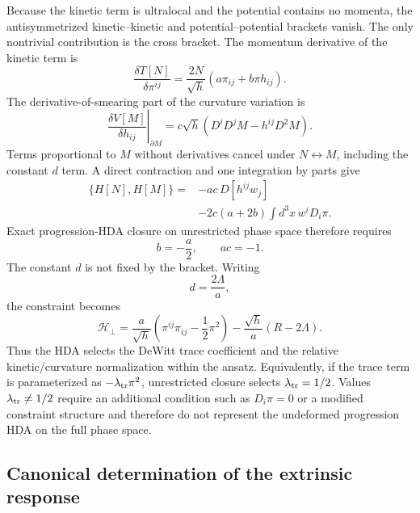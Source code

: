 \documentclass[11pt]{article}
\begin{document}
Because the kinetic term is ultralocal and the potential contains no momenta, the antisymmetrized kinetic--kinetic and potential--potential brackets vanish. The only nontrivial contribution is the cross bracket. The momentum derivative of the kinetic term is
\begin{equation}
    \frac{\delta T[N]}{\delta\pi^{ij}}
    =\frac{2N}{\sqrt h}
    \left(a\pi_{ij}+b\pi h_{ij}\right).
    \label{eq:dT_dpi}
\end{equation}
The derivative-of-smearing part of the curvature variation is
\begin{equation}
    \left.
    \frac{\delta V[M]}{\delta h_{ij}}
    \right|_{\partial M}
    =c\sqrt h\left(D^iD^jM-h^{ij}D^2M\right).
    \label{eq:dV_dh}
\end{equation}
Terms proportional to $M$ without derivatives cancel under $N\leftrightarrow M$, including the constant $d$ term. A direct contraction and one integration by parts give
\begin{equation}
\boxed{
\begin{aligned}
\{H[N],H[M]\}
={}&-ac\,D[h^{ij}w_j]\\
&-2c(a+2b)\int d^3x\,w^iD_i\pi .
\end{aligned}}
\label{eq:abcd_bracket}
\end{equation}
Exact progression-HDA closure on unrestricted phase space therefore requires
\begin{equation}
    \boxed{b=-\frac a2,\qquad ac=-1.}
    \label{eq:abcd_conditions}
\end{equation}
The constant $d$ is not fixed by the bracket. Writing
\begin{equation}
    d=\frac{2\Lambda}{a},
\end{equation}
the constraint becomes
\begin{equation}
\boxed{
\mathcal H_\perp
=\frac{a}{\sqrt h}
\left(\pi^{ij}\pi_{ij}-\frac12\pi^2\right)
-\frac{\sqrt h}{a}
\left(R-2\Lambda\right).}
\label{eq:ADM_selected_constraint}
\end{equation}
Thus the HDA selects the DeWitt trace coefficient and the relative kinetic/curvature normalization within the ansatz. Equivalently, if the trace term is parameterized as $-\lambda_{\rm tr}\pi^2$, unrestricted closure selects $\lambda_{\rm tr}=1/2$. Values $\lambda_{\rm tr}\neq1/2$ require an additional condition such as $D_i\pi=0$ or a modified constraint structure and therefore do not represent the undeformed progression HDA on the full phase space.

\subsection{Canonical determination of the extrinsic response}
\end{document}
